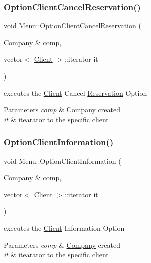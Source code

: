 \subsubsection{\texorpdfstring{Option\+Client\+Cancel\+Reservation()}{OptionClientCancelReservation()}}
{\footnotesize\ttfamily void Menu\+::\+Option\+Client\+Cancel\+Reservation (\begin{DoxyParamCaption}\item[{\hyperlink{class_company}{Company} \&}]{comp,  }\item[{vector$<$ \hyperlink{class_client}{Client} $>$\+::iterator}]{it }\end{DoxyParamCaption})}



executes the \hyperlink{class_client}{Client} Cancel \hyperlink{class_reservation}{Reservation} Option 


\begin{DoxyParams}{Parameters}
{\em comp} & \hyperlink{class_company}{Company} created\\
\hline
{\em it} & itearator to the specific client \\
\hline
\end{DoxyParams}
\hypertarget{class_menu_a98225b6d738861c594f16da8f5d732b3}{}\label{class_menu_a98225b6d738861c594f16da8f5d732b3} 
\subsubsection{\texorpdfstring{Option\+Client\+Information()}{OptionClientInformation()}}
{\footnotesize\ttfamily void Menu\+::\+Option\+Client\+Information (\begin{DoxyParamCaption}\item[{\hyperlink{class_company}{Company} \&}]{comp,  }\item[{vector$<$ \hyperlink{class_client}{Client} $>$\+::iterator}]{it }\end{DoxyParamCaption})}



executes the \hyperlink{class_client}{Client} Information Option 


\begin{DoxyParams}{Parameters}
{\em comp} & \hyperlink{class_company}{Company} created\\
\hline
{\em it} & itearator to the specific client \\
\hline
\end{DoxyParams}
\hypertarget{class_menu_aaa94126d89c324140b5a31e6d8aeb059}{}\label{class_menu_aaa94126d89c324140b5a31e6d8aeb059} 
